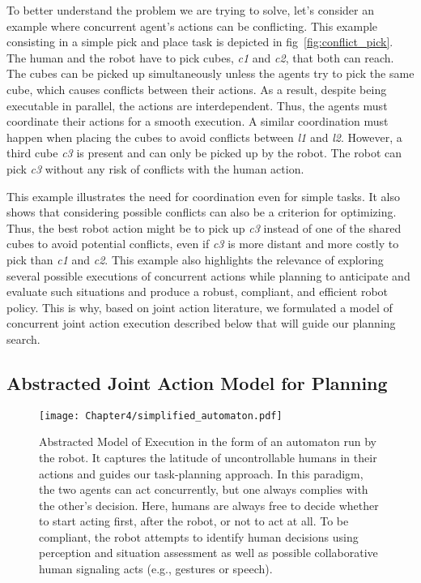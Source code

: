 To better understand the problem we are trying to solve, let's consider an example where concurrent agent's actions can be conflicting. This example consisting in a simple pick and place task is depicted in fig~\ref{fig:conflict_pick}. The human and the robot have to pick cubes, \emph{c1} and \emph{c2}, that both can reach. 
The cubes can be picked up simultaneously unless the agents try to pick the same cube, which causes conflicts between their actions. As a result, despite being executable in parallel, the actions are interdependent. Thus, the agents must coordinate their actions for a smooth execution.
A similar coordination must happen when placing the cubes to avoid conflicts between \emph{l1} and \emph{l2}.
However, a third cube \emph{c3} is present and can only be picked up by the robot. The robot can pick \emph{c3} without any risk of conflicts with the human action. 

This example illustrates the need for coordination even for simple tasks. It also shows that considering possible conflicts can also be a criterion for optimizing. Thus, the best robot action might be to pick up \emph{c3} instead of one of the shared cubes to avoid potential conflicts, even if \emph{c3} is more distant and more costly to pick than \emph{c1} and \emph{c2}.
This example also highlights the relevance of exploring several possible executions of concurrent actions while planning to anticipate and evaluate such situations and produce a robust, compliant, and efficient robot policy. This is why, based on joint action literature, we formulated a model of concurrent joint action execution described below that will guide our planning search.

\subsection{Abstracted Joint Action Model for Planning}

\begin{figure}
    \centering
    \texttt{[image: Chapter4/simplified\_automaton.pdf]}
    \caption{
    Abstracted Model of Execution in the form of an automaton run by the robot. It captures the latitude of uncontrollable humans in their actions and guides our task-planning approach.
    In this paradigm, the two agents can act concurrently, but one always complies with the other's decision.
    Here, humans are always free to decide whether to start acting first, after the robot, or not to act at all.
    To be compliant, the robot attempts to identify human decisions using perception and situation assessment as well as possible collaborative human signaling acts (e.g., gestures or speech).
    }
    \label{fig:simplified_model_exec}
\end{figure}

